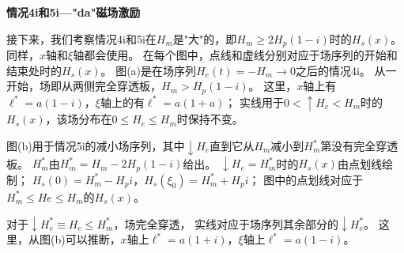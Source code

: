 \textbf{情况4i和5i---"da"磁场激励}

接下来，我们考察情况4i和5i在$H_m$是"大"的，即$H_m\ge 2H_p(1-i)$时的$H_s(x)$。
同样，$x$轴和$\xi$轴都会使用。
在每个图中，点线和虚线分别对应于场序列的开始和结束处时的$H_s(x)$。
图(a)是在场序列$H_e(t)= -H_m\rightarrow 0$之后的情况4i。
从一开始，场即从两侧完全穿透板，$H_m> H_p(1-i)$。
这里，$x$轴上有$\ell^*= a(1-i)$，$\xi$轴上的有$\ell^*= a(1+a)$；
实线用于$0 <\uparrow H_e <H_m$时的$H_s(x)$，该场分布在$0\le H_e\le H_m$时保持不变。

图(b)用于情况5i的减小场序列，其中$\downarrow H_e$直到它从$H_m$减小到$H_m^*$第没有完全穿透板。
$H_m^*$由$H_m^*= H_m -2H_p(1-i)$给出。
$\downarrow H_e = H_m^*$时的$H_s(x)$由点划线绘制；
$H_s(0)= H_m^* -H_p i$，$H_s(\xi_0)= H_m^* + H_p i$；
图中的点划线对应于$H_m^*\le He\le H_m$的$H_s(x)$。

对于$\downarrow H_e^*\equiv H_e\le H_m^*$，场完全穿透，
实线对应于场序列其余部分的$\downarrow H_e^*$。
这里，从图(b)可以推断，$x$轴上$\ell^* = a(1+i)$，$\xi$轴上$\ell^* = a(1-i)$。

